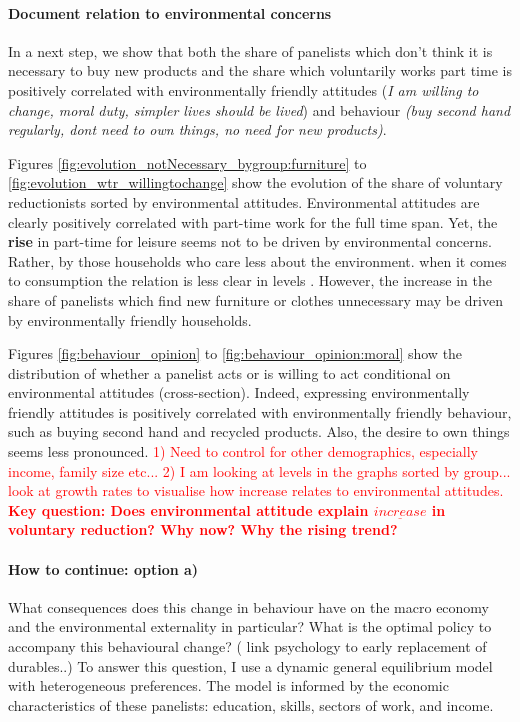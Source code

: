 \documentclass[12pt]{article}
\newcommand{\tr}[1]{\textcolor{red}{#1}}
\begin{document}
\paragraph{Document relation to environmental concerns} 
In a next step, we show that both the share of panelists which don't think it is necessary to buy new products and the share which voluntarily works part time is positively correlated with environmentally friendly attitudes (\textit{I am willing to change, moral duty, simpler lives should be lived}) and behaviour \textit{(buy second hand regularly, dont need to own things, no need for new products)}.

Figures \ref{fig:evolution_notNecessary_bygroup:furniture} to \ref{fig:evolution_wtr_willingtochange} show the evolution of the share of voluntary reductionists sorted by environmental attitudes. 
Environmental attitudes are clearly positively correlated with part-time work for the full time span. Yet, the \textbf{rise} in part-time for leisure seems not to be driven by environmental concerns. Rather, by those households who care less about the environment. 
when it comes to consumption the relation is less clear in levels . However, the increase in the share of panelists which find new furniture or clothes unnecessary may be driven by environmentally friendly households. 

Figures \ref{fig:behaviour_opinion} to \ref{fig:behaviour_opinion:moral} show the distribution of whether a panelist acts or is willing to act conditional on environmental attitudes (cross-section). Indeed, expressing environmentally friendly attitudes is positively correlated with environmentally friendly behaviour, such as buying second hand and recycled products. Also, the desire to own things seems less pronounced.
\tr{1) Need to control for other demographics, especially income, family size etc...}
 \tr{2) I am looking at levels in the graphs sorted by group... look at growth rates to visualise how increase relates to environmental attitudes.} \textbf{\tr{Key question: Does environmental attitude explain $\underline{increase}$ in voluntary reduction? Why now? Why the rising trend?} }

\paragraph{How to continue: option a)}
What consequences does this change in behaviour have on the macro economy and the environmental externality in particular? What is the optimal policy to accompany this behavioural change? (\cite{Hou2020FeelingsIntentions} link psychology to early replacement of durables..)
To answer this question, I use a dynamic general equilibrium model with heterogeneous preferences. The model is informed by the economic characteristics of these panelists: education, skills, sectors of work, and income. 
\end{document}
